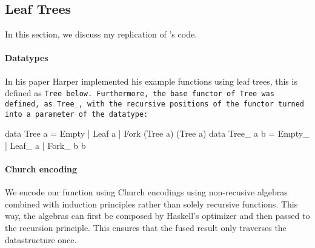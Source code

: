 \long{}
\subsection{Leaf Trees}
In this section, we discuss my replication of \cite{Harper2011}'s code.

\paragraph{Datatypes} In his paper Harper implemented his example functions using leaf trees, this is defined as \tt{Tree} below.
Furthermore, the base functor of \tt{Tree} was defined, as \tt{Tree\_}, with the recursive positions of the functor turned into a parameter of the datatype:
\begin{code}
data Tree a = Empty | Leaf a | Fork (Tree a) (Tree a)
data Tree_ a b = Empty_ | Leaf_ a | Fork_ b b
\end{code}
\paragraph{Church encoding}
We encode our function using Church encodings using non-recusive algebras combined with induction principles rather than solely recursive functions.
This way, the algebras can first be composed by Haskell's optimizer and then passed to the recursion principle.
This ensures that the fused result only traverses the datastructure once.

